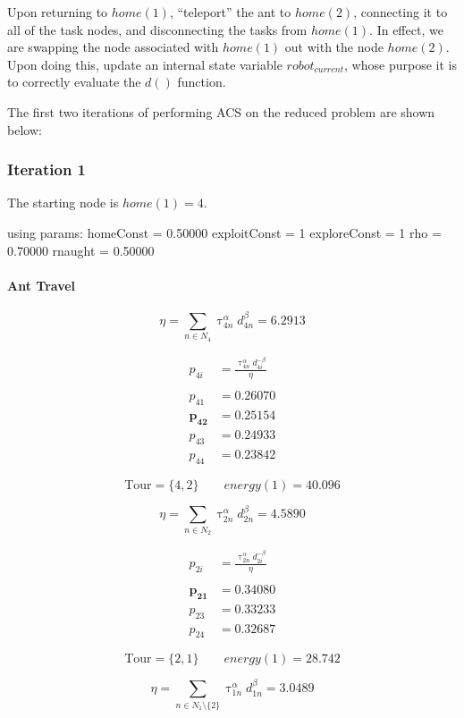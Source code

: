 \documentclass[a4paper]{article}
\newcommand{\subsubsubsection}[1]{\paragraph{#1} \mbox{}}
\begin{document}
Upon returning to $\mathit{home}(1)$, ``teleport'' the ant to $\mathit{home}(2)$, connecting it to all
of the task nodes, and disconnecting the tasks from $\mathit{home}(1)$. In effect, we are swapping the node associated with $\mathit{home}(1)$ out with the node $\mathit{home}(2)$. Upon doing this, update an
internal state variable $robot_{current}$, whose purpose it is to correctly
evaluate the $d()$ function.

The first two iterations of performing ACS on the reduced problem are shown below:

\subsubsection{Iteration 1}

The starting node is $\mathit{home}(1) = 4$.

using params:
homeConst =  0.50000
exploitConst =  1
exploreConst =  1
rho =  0.70000
rnaught =  0.50000


\subsubsubsection{Ant Travel}
$$
\eta = \sum_{n \in N_4} \uptau_{4n}^\alpha d_{4n}^\beta = 6.2913
$$

\begin{align*}
p_{4i} &= \frac{\uptau_{4n}^\alpha d_{4i}^{-\beta}}{\eta} \\
\\
p_{41} &= 0.26070 \\
\mathbf{p_{42}} &= \mathbf{0.25154} \\
p_{43} &= 0.24933 \\
p_{44} &= 0.23842
\end{align*}

$$
\text{Tour} = \{4, 2\} \qquad \mathit{energy}(1) = 40.096
$$


$$
\eta = \sum_{n \in N_2} \uptau_{2n}^\alpha d_{2n}^\beta = 4.5890
$$

\begin{align*}
p_{2i} &= \frac{\uptau_{2n}^\alpha d_{2i}^{-\beta}}{\eta} \\
\\
\mathbf{p_{21}} &= \mathbf{0.34080} \\
p_{23} &= 0.33233 \\
p_{24} &= 0.32687
\end{align*}

$$
\text{Tour} = \{2, 1\} \qquad \mathit{energy}(1) = 28.742
$$


$$
\eta = \sum_{n \in N_1\setminus\{2\}} \uptau_{1n}^\alpha d_{1n}^\beta = 3.0489
$$
\end{document}
